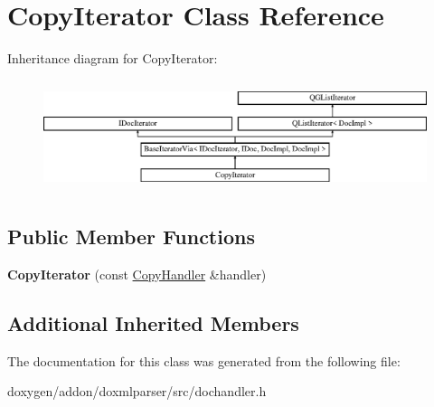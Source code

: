 \hypertarget{class_copy_iterator}{}\section{Copy\+Iterator Class Reference}
\label{class_copy_iterator}
Inheritance diagram for Copy\+Iterator\+:\begin{figure}[H]
\begin{center}
\leavevmode
\includegraphics[height=3.294118cm]{class_copy_iterator}
\end{center}
\end{figure}
\subsection*{Public Member Functions}
\begin{DoxyCompactItemize}
\item 
\mbox{\label{class_copy_iterator_a81a4a3d40ae73534c8f82f45b99fe07f}} 
{\bfseries Copy\+Iterator} (const \mbox{\hyperlink{class_copy_handler}{Copy\+Handler}} \&handler)
\end{DoxyCompactItemize}
\subsection*{Additional Inherited Members}


The documentation for this class was generated from the following file\+:\begin{DoxyCompactItemize}
\item 
doxygen/addon/doxmlparser/src/dochandler.\+h\end{DoxyCompactItemize}
